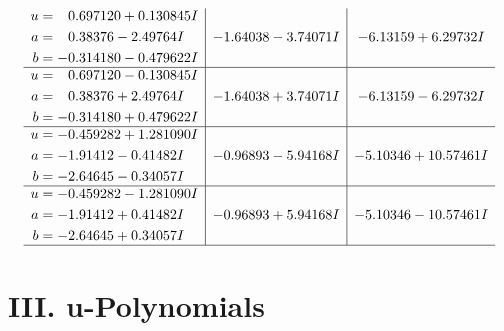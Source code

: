 \documentclass[1p]{elsarticle_modified}
\theoremstyle{definition}
\begin{document}
$$\begin{array}{c|c|c}
\begin{aligned}
u &= \phantom{-}0.697120 + 0.130845 I \\
a &= \phantom{-}0.38376 - 2.49764 I \\
b &= -0.314180 - 0.479622 I\end{aligned}
 & -1.64038 - 3.74071 I & -6.13159 + 6.29732 I \\ \hline\begin{aligned}
u &= \phantom{-}0.697120 - 0.130845 I \\
a &= \phantom{-}0.38376 + 2.49764 I \\
b &= -0.314180 + 0.479622 I\end{aligned}
 & -1.64038 + 3.74071 I & -6.13159 - 6.29732 I \\ \hline\begin{aligned}
u &= -0.459282 + 1.281090 I \\
a &= -1.91412 - 0.41482 I \\
b &= -2.64645 - 0.34057 I\end{aligned}
 & -0.96893 - 5.94168 I & -5.10346 + 10.57461 I \\ \hline\begin{aligned}
u &= -0.459282 - 1.281090 I \\
a &= -1.91412 + 0.41482 I \\
b &= -2.64645 + 0.34057 I\end{aligned}
 & -0.96893 + 5.94168 I & -5.10346 - 10.57461 I\\
 \hline 
 \end{array}$$\newpage
\newpage\renewcommand{\arraystretch}{1}
\centering \section*{ III. u-Polynomials}
\end{document}
